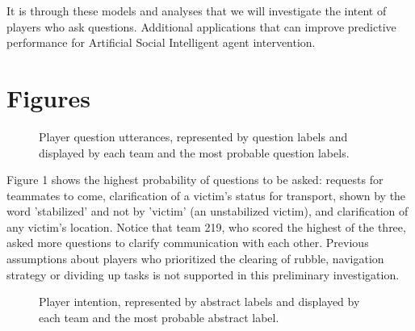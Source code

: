 It is through these models and analyses that we will investigate the intent of players who ask questions. Additional applications that can improve predictive performance for Artificial Social Intelligent agent intervention.


\section{Figures}

\begin{figure}[h!]
    \centering
    \caption{Player question utterances, represented by question labels and displayed by each team and the most probable question labels.}
\end{figure}

Figure 1 shows the highest probability of questions to be asked: requests for teammates to come, clarification of a victim's status for transport, shown by the word 'stabilized' and not by 'victim' (an unstabilized victim), and clarification of any victim's location. Notice that team 219, who scored the highest of the three, asked more questions to clarify communication with each other. Previous assumptions about players who prioritized the clearing of rubble, navigation strategy or dividing up tasks is not supported in this preliminary investigation.


\vspace{30pt}

\begin{figure}[h!]
    \centering
    \caption{Player intention, represented by abstract labels and displayed by each team and the most probable abstract label. }
\end{figure}

